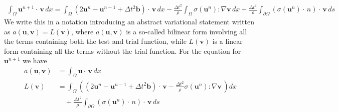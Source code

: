 \documentclass[twoside]{article}
\begin{document}
\begin{align}
	\label{eq:scheme}
	\int_{\Omega} \mathbf{u}^{n+1} \cdot \, \mathbf{v} \, dx = \int_{\Omega} \left( 2\mathbf{u}^{n} - \mathbf{u}^{n-1} + \Delta t^2 \mathbf{b} \right)  \cdot \, \mathbf{v} \, dx - \frac{\Delta t^2}{\rho} \int_{\Omega}  \sigma(\mathbf{u}^n) : \nabla \mathbf{v} \, dx + \frac{\Delta t^2}{\rho}  \int_{\partial \Omega} (\sigma(\mathbf{u}^n) \cdot \,n) \cdot \, \mathbf{v} \, ds
\end{align}
We  write this in a notation introducing an abstract variational statement
written as \( a(\mathbf{u}, \mathbf{v}) = L(\mathbf{v})\), where \( a(\mathbf{u}, \mathbf{v})\) is a so-called bilinear form involving all
the terms containing both the test and trial function, while \( L(\mathbf{v})\) is a linear
form containing all the terms without the trial function. For the equation for \( \mathbf{u}^{n+1}\) we have
\begin{align}
	a(\mathbf{u}, \mathbf{v}) &= \int_{\Omega} \mathbf{u} \cdot \, \mathbf{v} \, dx \\
	L(\mathbf{v}) &= \int_{\Omega} \left( \left( 2\mathbf{u}^{n} - \mathbf{u}^{n-1} + \Delta t^2 \mathbf{b} \right)  \cdot \, \mathbf{v}  - \frac{\Delta t^2}{\rho}  \sigma(\mathbf{u}^n) : \nabla \mathbf{v} \, \right) dx \\
	&\quad+ \frac{\Delta t^2}{\rho}  \int_{\partial \Omega} (\sigma(\mathbf{u}^n) \cdot \,n) \cdot \, \mathbf{v} \, ds
\end{align}
\end{document}
